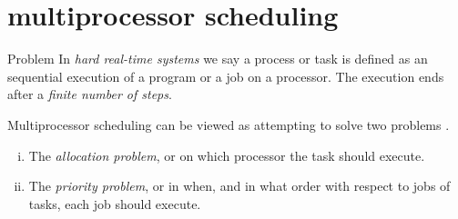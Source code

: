 \documentclass{beamer}
\begin{document}

	
	\section{multiprocessor scheduling}
	
	\begin{frame}{Problem}	
	In \emph{hard real-time systems} we say a process or task is defined as an sequential execution of a program or a job on a processor.
	The execution ends after a \emph{finite number of steps}.\\	
	
	
	\begin{definition}
			\label{remark:problems}
			Multiprocessor scheduling can be viewed as attempting  to solve two problems \cite{DB2011}.
			\begin{enumerate}[(i)]
				\item The \emph{allocation problem}, or on which processor the task should execute.
				\item The \emph{priority problem}, or in when, and in what order with respect to jobs of tasks, each job should execute.			
			\end{enumerate}
		\end{definition}
	\end{frame}
	
  
%      
\end{document}
